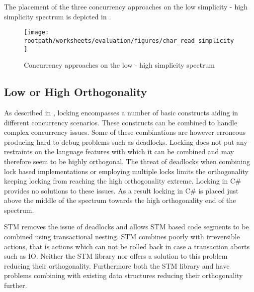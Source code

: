 The placement of the three concurrency approaches on the low simplicity - high simplicity spectrum is depicted in .

\begin{figure}[htbp]
\centering
 \texttt{[image: \\rootpath/worksheets/evaluation/figures/char\_read\_simplicity]} 
 \caption{Concurrency approaches on the low - high simplicity spectrum}
\label{fig:char_simplicity}
\end{figure}
\subsection{Low or High Orthogonality}\label{subsec:orthogonality}
As described in , locking encompasses a number of basic constructs aiding in different concurrency scenarios. These constructs can be combined to handle complex concurrency issues. Some of these combinations are however erroneous producing hard to debug problems such as deadlocks. Locking does not put any restraints on the language features with which it can be combined and may therefore seem to be highly orthogonal. The threat of deadlocks when combining lock based implementations or employing multiple locks limits the orthogonality keeping locking from reaching the high orthogonality extreme. Locking in C\# provides no solutions to these issues. As a result locking in C\# is placed just above the middle of the spectrum towards the high orthogonality end of the spectrum.

\ac{STM} removes the issue of deadlocks and allows \ac{STM} based code segments to be combined using transactional nesting. \ac{STM} combines poorly with irreversible actions, that is actions which can not be rolled back in case a transaction aborts such as \ac{IO}. Neither the \ac{STM} library nor \stmnamesp offers a solution to this problem reducing their orthogonality. Furthermore both the \ac{STM} library and \stmnamesp have problems combining with existing data structures reducing their orthogonality further.

